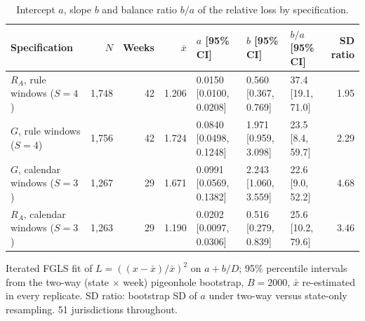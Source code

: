 \begin{table}[htbp]
\centering
\footnotesize
\caption{Intercept $a$, slope $b$ and balance ratio $b/a$ of the relative loss by specification.}
\label{tab:s1}
\begin{tabular}{lrrrlllr}
\toprule
Specification & $N$ & Weeks & $\bar{x}$ & $a$ [95\% CI] & $b$ [95\% CI] & $b/a$ [95\% CI] & SD ratio \\
\midrule
$R_A$, rule windows ($S=4$) & 1{,}748 & 42 & 1.206 & 0.0150 [0.0100, 0.0208] & 0.560 [0.367, 0.769] & 37.4 [19.1, 71.0] & 1.95 \\
$G$, rule windows ($S=4$) & 1{,}756 & 42 & 1.724 & 0.0840 [0.0498, 0.1248] & 1.971 [0.959, 3.098] & 23.5 [8.4, 59.7] & 2.29 \\
$G$, calendar windows ($S=3$) & 1{,}267 & 29 & 1.671 & 0.0991 [0.0569, 0.1382] & 2.243 [1.060, 3.559] & 22.6 [9.0, 52.2] & 4.68 \\
$R_A$, calendar windows ($S=3$) & 1{,}263 & 29 & 1.190 & 0.0202 [0.0097, 0.0306] & 0.516 [0.279, 0.839] & 25.6 [10.2, 79.6] & 3.46 \\
\bottomrule
\end{tabular}
\par\smallskip
\begin{minipage}{0.95\linewidth}\scriptsize Iterated FGLS fit of $L=((x-\bar{x})/\bar{x})^2$ on $a+b/D$; 95\% percentile intervals from the two-way (state $\times$ week) pigeonhole bootstrap, $B=2000$, $\bar{x}$ re-estimated in every replicate. SD ratio: bootstrap SD of $a$ under two-way versus state-only resampling. 51 jurisdictions throughout.\end{minipage}
\end{table}
